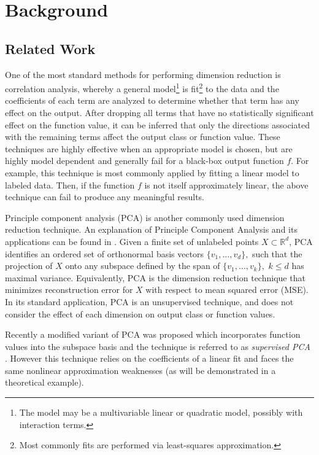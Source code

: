 \documentclass{scspaperproc}
\theoremstyle{scsthe}
\begin{document}
\section{Background}
\label{sec:background}

\subsection{Related Work}
\label{sec:related}

One of the most standard methods for performing dimension reduction is
correlation analysis, whereby a general model\footnote{The model may be a
multivariable linear or quadratic model, possibly with interaction
terms.} is fit\footnote{Most commonly fits are performed via least-squares
approximation.} to the data and the coefficients of each term are
analyzed to determine whether that term has any effect on the
output. After dropping all terms that have no statistically
significant effect on the function value, it can be inferred that only
the directions associated with the remaining terms affect the output
class or function value. These techniques are highly effective when an
appropriate model is chosen, but are highly model dependent and
generally fail for a black-box output function $f$. For example, this
technique is most commonly applied by fitting a linear model to
labeled data. Then, if the function $f$ is not itself approximately
linear, the above technique can fail to produce any meaningful
results.

Principle component analysis (PCA) is another commonly used dimension
reduction technique. An explanation of Principle Component Analysis
and its applications can be found in
. Given a finite set of unlabeled
points $X \subset \mathbb{R}^d$, PCA identifies an ordered set of
orthonormal basis vectors $\{v_1, \ldots, v_d\},$ such that the
projection of $X$ onto any subspace defined by the span of $\{v_1,
\ldots, v_k\},$ $k \leq d$ has maximal variance. Equivalently, PCA is
the dimension reduction technique that minimizes reconstruction error
for $X$ with respect to mean squared error (MSE). In its standard
application, PCA is an unsupervised technique, and does not consider
the effect of each dimension on output class or function values.

Recently a modified variant of PCA was proposed which incorporates
function values into the subspace basis and the technique is referred
to as \textit{supervised PCA}
. However this technique relies on
the coefficients of a linear fit and faces the same nonlinear
approximation weaknesses (as will be demonstrated in a theoretical
example).
\end{document}
